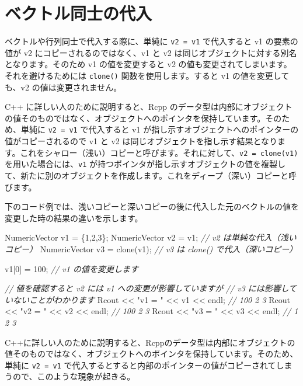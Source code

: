\documentclass[]{book}
\newenvironment{Shaded}{\begin{snugshade}}{\end{snugshade}}
\newcommand{\CommentTok}[1]{\textcolor[rgb]{0.56,0.35,0.01}{\textit{#1}}}
\newcommand{\DecValTok}[1]{\textcolor[rgb]{0.00,0.00,0.81}{#1}}
\newcommand{\NormalTok}[1]{#1}
\newcommand{\StringTok}[1]{\textcolor[rgb]{0.31,0.60,0.02}{#1}}
\begin{document}
\section{ベクトル同士の代入}

ベクトルや行列同士で代入する際に、単純に \texttt{v2\ =\ v1} で代入すると v1 の要素の値が v2 にコピーされるのではなく、v1 と v2 は同じオブジェクトに対する別名となります。そのため v1 の値を変更すると v2 の値も変更されてしまいます。それを避けるためには \texttt{clone()} 関数を使用します。すると v1 の値を変更しても、v2 の値は変更されません。

C++ に詳しい人のために説明すると、Rcpp のデータ型は内部にオブジェクトの値そのものではなく、オブジェクトへのポインタを保持しています。そのため、単純に \texttt{v2\ =\ v1} で代入すると v1 が指し示すオブジェクトへのポインターの値がコピーされるので v1 と v2 は同じオブジェクトを指し示す結果となります。これをシャロー（浅い）コピーと呼びます。それに対して、\texttt{v2\ =\ clone(v1)} を用いた場合には、\texttt{v1} が持つポインタが指し示すオブジェクトの値を複製して、新たに別のオブジェクトを作成します。これをディープ（深い）コピーと呼びます。

下のコード例では、浅いコピーと深いコピーの後に代入した元のベクトルの値を変更した時の結果の違いを示します。

\begin{Shaded}
\begin{Highlighting}[]
\NormalTok{NumericVector v1 = \{}\DecValTok{1}\NormalTok{,}\DecValTok{2}\NormalTok{,}\DecValTok{3}\NormalTok{\};}
\NormalTok{NumericVector v2 = v1;        }\CommentTok{// v2 は単純な代入（浅いコピー）}
\NormalTok{NumericVector v3 = clone(v1); }\CommentTok{// v3 は clone() で代入（深いコピー）}

\NormalTok{v1[}\DecValTok{0}\NormalTok{] = }\DecValTok{100}\NormalTok{; }\CommentTok{// v1 の値を変更します}

\CommentTok{// 値を確認すると v2 には v1 への変更が影響していますが}
\CommentTok{// v3 には影響していないことがわかります}
\NormalTok{Rcout << }\StringTok{"v1 = "}\NormalTok{ << v1 << endl; }\CommentTok{// 100 2 3}
\NormalTok{Rcout << }\StringTok{"v2 = "}\NormalTok{ << v2 << endl; }\CommentTok{// 100 2 3}
\NormalTok{Rcout << }\StringTok{"v3 = "}\NormalTok{ << v3 << endl; }\CommentTok{// 1 2 3}
\end{Highlighting}
\end{Shaded}

C++に詳しい人のために説明すると、Rcppのデータ型は内部にオブジェクトの値そのものではなく、オブジェクトへのポインタを保持しています。そのため、単純に \texttt{v2\ =\ v1} で代入するとすると内部のポインターの値がコピーされてしまうので、このような現象が起きる。
\end{document}
